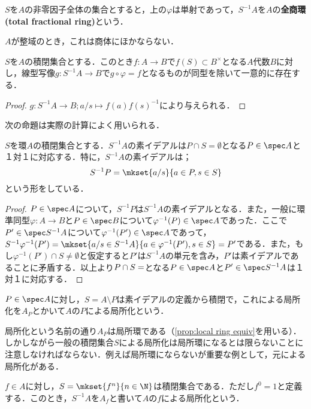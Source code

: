 \begin{defi}[全商環]
$S$を$A$の非零因子全体の集合とすると，上の$\varphi$は単射であって，$S^{-1}A$を$A$の\textbf{全商環(total fractional ring)}という．
\end{defi}

$A$が整域のとき，これは商体にほかならない．
\begin{prop}[分数環の普遍性]
	$S$を$A$の積閉集合とする．このとき$f:A\to B$で$f(S)\subset B^\times$となる$A$代数$B$に対し，線型写像$g:S^{-1}A\to B$で$g\circ\varphi=f$となるものが同型を除いて一意的に存在する．
\end{prop}
\begin{proof}
	$g:S^{-1}A\to B;a/s\mapsto f(a)f(s)^{-1}$により与えられる．
\end{proof}

次の命題は実際の計算によく用いられる．
\begin{prop}\label{prop:Spec S^-1Aの引き戻し}
	$S$を環$A$の積閉集合とする．$S^{-1}A$の素イデアルは$P\cap S=\emptyset$となる$P\in\spec A$と１対１に対応する．特に，$S^{-1}A$の素イデアルは；
	\[S^{-1}P=\mkset{a/s}{a\in P,s\in S}\]
	という形をしている．
\end{prop}
\begin{proof}
	$P\in\spec A$について，$S^{-1}P$は$S^{-1}A$の素イデアルとなる．また，一般に環準同型$\varphi:A\to B$と$P\in\spec B$について$\varphi^{-1}(P)\in\spec A$であった．ここで$P'\in\spec S^{-1}A$について$\varphi^{-1}(P')\in\spec A$であって，$S^{-1}\varphi^{-1}(P')=\mkset{a/s\in S^{-1}A}{a\in\varphi^{-1}(P'),s\in S}=P'$である．また，もし$\varphi^{-1}(P')\cap S\neq\emptyset$と仮定すると$P'$は$S^{-1}A$の単元を含み，$P'$は素イデアルであることに矛盾する．以上より$P\cap S=\empty$となる$P\in\spec A$と$P'\in\spec S^{-1}A$は１対１に対応する．
\end{proof}

\begin{defi}
	$ P\in\spec A$に対し，$S=A\setminus P$は素イデアルの定義から積閉で，これによる局所化を$A_P$とかいて$A$の$P$による局所化という．
\end{defi}

局所化という名前の通り$A_P$は局所環である（\ref{prop:local ring equiv}を用いる）．しかしながら一般の積閉集合$S$による局所化は局所環になるとは限らないことに注意しなければならない．例えば局所環にならないが重要な例として，元による局所化がある．

\begin{defi}
	$f\in A$に対し，$S=\mkset{f^n}{n\in\N}$は積閉集合である．ただし$f^0=1$と定義する．このとき，$S^{-1}A$を$A_f$と書いて$A$の$f$による局所化という．	
\end{defi}

